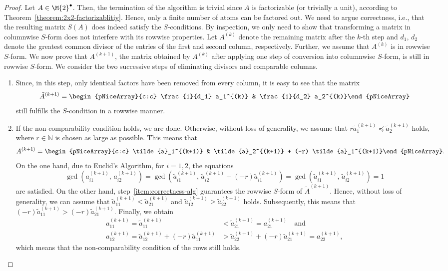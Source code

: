 \begin{proof}
Let $A \in {\M{2}}^\bullet$. Then, the termination of the algorithm is trivial since $A$ is factorizable (or trivially a unit), according to Theorem~\ref{theorem:2x2-factorizablitiy}. Hence, only a finite number of atoms can be factored out. We need to argue correctness, i.e., that the resulting matrix $S(A)$ does indeed satisfy the $S$-conditions. By inspection, we only need to show that transforming a matrix in columnwise $S$-form does not interfere with its rowwise properties. Let $A^{(k)}$ denote the remaining matrix after the $k$-th step and $d_1$, $d_2$ denote the greatest common divisor of the entries of the first and second column, respectively. Further, we assume that $A^{(k)}$ is in rowwise $S$-form. We now prove that $A^{(k+1)}$, the matrix obtained by $A^{(k)}$ after applying one step of conversion into columnwise $S$-form, is still in rowwise $S$-form. We consider the two successive steps of eliminating divisors and comparable columns.
\begin{enumerate}[label=(\alph*)]
\item\label{item:correctness-alg} Since, in this step, only identical factors have been removed from every column, it is easy to see that the matrix 
\[\tilde{A}^{(k+1)} = \begin{pNiceArray}{c:c} \frac{1}{d_1} a_1^{(k)} & \frac{1}{d_2} a_2^{(k)}\end{pNiceArray} \]
still fulfills the $S$-condition in a rowwise manner.
\item If the non-comparability condition holds, we are done. Otherwise, without loss of generality, we assume that $r \tilde{a}_1^{(k+1)} \preceq \tilde{a}_2^{(k+1)}$ holds, where $r \in \mathbb{N}$ is chosen as large as possible. This means that
\[ A^{(k+1)} = \begin{pNiceArray}{c:c} \tilde{a}_1^{(k+1)} & \tilde{a}_2^{(k+1)} + (-r) \tilde{a}_1^{(k+1)}\end{pNiceArray}. \]
On the one hand, due to Euclid's Algorithm, for $i=1,2$, the equations
\[ \gcd(a_{i1}^{(k+1)},\, a_{i2}^{(k+1)}) = \gcd(\tilde{a}_{i1}^{(k+1)},\, \tilde{a}_{i2}^{(k+1)} + (-r) \tilde{a}_{i1}^{(k+1)}) = \gcd(\tilde{a}_{i1}^{(k+1)},\, \tilde{a}_{i2}^{(k+1)})= 1 \]
are satisfied. On the other hand, step~\ref{item:correctness-alg} guarantees the rowwise $S$-form of $\tilde{A}^{(k+1)}$. Hence, without loss of generality, we can assume that $\tilde{a}_{11}^{(k+1)} <  \tilde{a}_{21}^{(k+1)}$ and $\tilde{a}_{12}^{(k+1)} >  \tilde{a}_{22}^{(k+1)}$ holds. Subsequently, this means that $(-r) \tilde{a}_{11}^{(k+1)} > (-r) \tilde{a}_{21}^{(k+1)}$. Finally, we obtain
\begin{align*}
a_{11}^{(k+1)} = \tilde{a}_{11}^{(k+1)} &< \tilde{a}_{21}^{(k+1)} = a_{21}^{(k+1)} \quad \text{and}  \\
a_{12}^{(k+1)} = \tilde{a}_{12}^{(k+1)} + (-r) \tilde{a}_{11}^{(k+1)} &> \tilde{a}_{22}^{(k+1)} + (-r) \tilde{a}_{21}^{(k+1)} = a_{22}^{(k+1)},
\end{align*}
which means that the non-comparability condition of the rows still holds.
\end{enumerate}
\end{proof}

